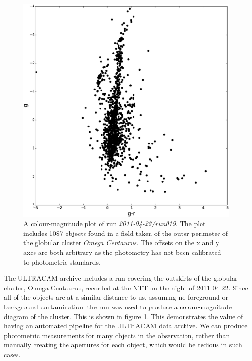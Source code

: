 \begin{figure}
\centering
\includegraphics[width=120mm]{images/2011-04-22-run019-omegacen-colourmagnitude.eps}
\caption{A colour-magnitude plot of run \emph{2011-04-22/run019}. The plot includes 1087 objects found in a field taken of the outer perimeter of the globular cluster \emph{Omega Centaurus}. The offsets on the x and y axes are both arbitrary as the photometry has not been calibrated to photometric standards. }
\label{fig:OmegaCen-colourmagnitude}
\end{figure}

The ULTRACAM archive includes a run covering the outskirts of the globular cluster, Omega Centaurus, recorded at the NTT on the night of 2011-04-22.  Since all of the objects are at a similar distance to us, assuming no foreground or background contamination, the run was used to produce a colour-magnitude diagram of the cluster. This is shown in figure \ref{fig:OmegaCen-colourmagnitude}. This demonstrates the value of having an automated pipeline for the ULTRACAM data archive. We can produce photometric measurements for many objects in the observation, rather than manually creating the apertures for each object, which would be tedious in such cases. 



